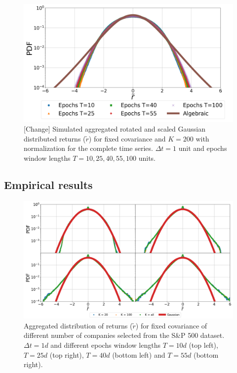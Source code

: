 \begin{figure}[htbp]
    \centering
    \includegraphics[width=0.6\columnwidth]
    {figures/06_epochs_sim_alg_ts_norm.png}
    \caption{[Change] Simulated aggregated rotated and scaled Gaussian distributed
             returns ($\tilde{r}$) for fixed covariance and $K=200$ with
             normalization for the complete time series. $\Delta t = 1$ unit
             and epochs window lengths $T=10, 25, 40, 55, 100$ units.}
    \label{fig:epochs_alg_agg_ret_pairs_norm_full_ts}
\end{figure}

\subsection{Empirical results}
\label{subsec:emp_results}

\begin{figure}[htbp]
    \centering
    \includegraphics[width=0.8\columnwidth]
    {figures/06_window_comparison.png}
    \caption{Aggregated distribution of returns ($\tilde{r}$) for fixed
             covariance of different number of companies selected from the S\&P
             500 dataset. $\Delta t = 1d$ and different epochs window lengths
             $T=10d$ (top left), $T=25d$ (top right), $T=40d$ (bottom left) and
             $T=55d$ (bottom right).}
    \label{fig:window_comparison_long_norm}
\end{figure}